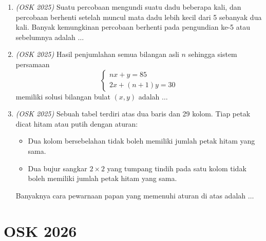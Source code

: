 \begin{enumerate}
	\item \textit{(OSK 2025)} Suatu percobaan mengundi suatu dadu beberapa kali, dan percobaan berhenti setelah muncul mata dadu lebih kecil dari 5 sebanyak dua kali. Banyak kemungkinan percobaan berhenti pada pengundian ke-5 atau sebelumnya adalah $\dots$
	
	\item \textit{(OSK 2025)} Hasil penjumlahan semua bilangan asli $n$ sehingga sistem persamaan
	\[
	\begin{cases}
		nx + y = 85 \\
		2x + (n+1)y = 30
	\end{cases}
	\]
	memiliki solusi bilangan bulat $(x,y)$ adalah $\dots$
	
	\item \textit{(OSK 2025)} Sebuah tabel terdiri atas dua baris dan 29 kolom. Tiap petak dicat hitam atau putih dengan aturan:
	\begin{itemize}
		\item[(i)] Dua kolom bersebelahan tidak boleh memiliki jumlah petak hitam yang sama.
		\item[(ii)] Dua bujur sangkar $2\times 2$ yang tumpang tindih pada satu kolom tidak boleh memiliki jumlah petak hitam yang sama.
	\end{itemize}
	Banyaknya cara pewarnaan papan yang memenuhi aturan di atas adalah $\dots$
\end{enumerate}
\newpage

\section{OSK 2026}
